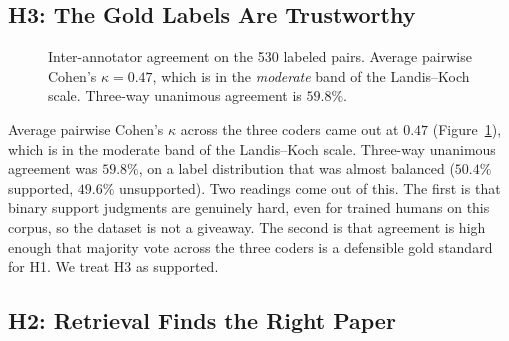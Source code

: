 \documentclass[10pt]{article}
\begin{document}
\subsection{H3: The Gold Labels Are Trustworthy}

\begin{figure}[t]
\centering
{}
\caption{Inter-annotator agreement on the 530 labeled pairs. Average
pairwise Cohen's $\kappa = 0.47$, which is in the \emph{moderate}
band of the Landis--Koch scale. Three-way unanimous agreement is
$59.8\%$.}
\label{fig:iaa}
\end{figure}

Average pairwise Cohen's $\kappa$ across the three coders came out
at $0.47$ (Figure~\ref{fig:iaa}), which is in the moderate band of
the Landis--Koch scale. Three-way unanimous agreement was $59.8\%$,
on a label distribution that was almost balanced ($50.4\%$
supported, $49.6\%$ unsupported). Two readings come out of this. The
first is that binary support judgments are genuinely hard, even for
trained humans on this corpus, so the dataset is not a giveaway.
The second is that agreement is high enough that majority vote across
the three coders is a defensible gold standard for H1. We treat H3
as supported.

\subsection{H2: Retrieval Finds the Right Paper}
\end{document}
